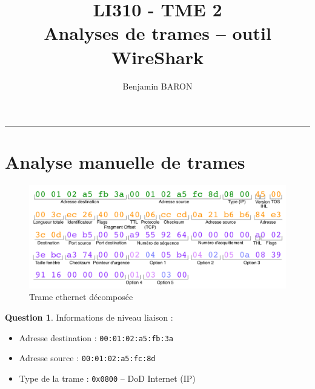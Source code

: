 \documentclass[11pt,english,french]{scrreprt}
\makeatletter
\theoremstyle{remark}
\theoremstyle{definition}
\newtheorem{ques}{Question}[section]
\renewcommand{\maketitle}{\begingroup%
    \let\footnotesize\small
    \let\footnoterule\relax
    \parindent \z@
    \reset@font
    \begin{flushleft}
      \huge \sffamily \bfseries\color{orange} \@title
    \end{flushleft}
    \hrule height 1pt
    \begin{flushright}
      \large\sffamily\color{MyDarkBlue}\@author
    \end{flushright}
  \endgroup%
  \setcounter{footnote}{0}%
}
\makeatother
\begin{document}
	
\title{LI310 - TME 2\\
Analyses de trames -- outil WireShark}
\author{Benjamin BARON}

\maketitle

\section{Analyse manuelle de trames} %


\begin{figure}[h!]
	\center
	\includegraphics[scale=.7]{graphes/trame-ethernet}
	\caption{Trame ethernet décomposée}
\end{figure}

\begin{ques}
	Informations de niveau liaison :\begin{itemize}
		\item Adresse destination : \lstinline!00:01:02:a5:fb:3a!
		\item Adresse source : \lstinline!00:01:02:a5:fc:8d!
		\item Type de la trame : \lstinline!0x0800! -- DoD Internet (IP)
	\end{itemize}
\end{ques}
\end{document}
